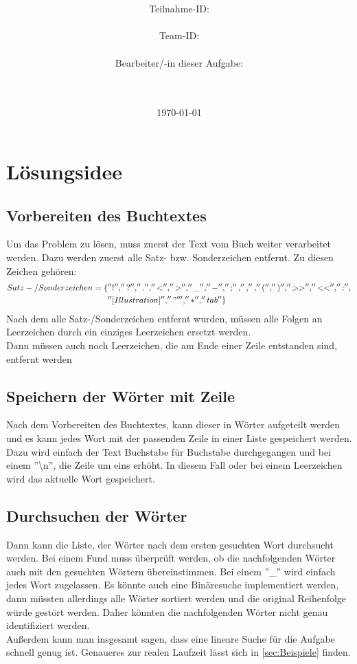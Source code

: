 \documentclass[a4paper,10pt,ngerman]{scrartcl}
\title{\textbf{\Huge\Aufgabe}}
\author{\LARGE Teilnahme-ID: \LARGE \TeilnahmeId \\\\
      \LARGE Team-ID: \LARGE \TeamId \\\\
	    \LARGE Bearbeiter/-in dieser Aufgabe: \\ 
	    \LARGE \Name\\\\}
\date{\LARGE\today}
\begin{document}
  \maketitle
  \tableofcontents
  \vspace{4cm}
  \section{Lösungsidee\label{sec:Loesungsidee}}
    \subsection{Vorbereiten des Buchtextes\label{sec:Loesungsidee:Vorbereiten}}
      Um das Problem zu lösen, muss zuerst der Text vom Buch weiter verarbeitet werden. Dazu werden zuerst alle Satz- bzw. Sonderzeichen entfernt. Zu diesen Zeichen gehören:\\
      \begin{equation}
        \begin{split}
          Satz-/Sonderzeichen = \{&''!'', ''?'', ''.'', ''<'', ''>'', ''\_'', ''-'', '';'', '','', ''('', '')'', ''>>'', ''<<'', '':'', \\
          & ''[Illustration]'', ''"''', ''*'', ''tab''\}
        \end{split}
      \end{equation}
      Nach dem alle Satz-/Sonderzeichen entfernt wurden, müssen alle Folgen an Leerzeichen durch ein einziges Leerzeichen ersetzt werden.\\
      Dann müssen auch noch Leerzeichen, die am Ende einer Zeile entstanden sind, entfernt werden
    \subsection{Speichern der Wörter mit Zeile}
      Nach dem Vorbereiten des Buchtextes, kann dieser in Wörter aufgeteilt werden und es kann jedes Wort mit der passenden Zeile in einer Liste gespeichert werden. Dazu wird einfach der Text Buchstabe für Buchstabe durchgegangen und bei einem ''\textbackslash n'', die Zeile um eins erhöht. In diesem Fall oder bei einem Leerzeichen wird das aktuelle Wort gespeichert.
    \subsection{Durchsuchen der Wörter}
      Dann kann die Liste, der Wörter nach dem ersten gesuchten Wort durchsucht werden. Bei einem Fund muss überprüft werden, ob die nachfolgenden Wörter auch mit den gesuchten Wörtern übereinstimmen. Bei einem ''\_'' wird einfach jedes Wort zugelassen. Es könnte auch eine Binäresuche implementiert werden, dann müssten allerdings alle Wörter sortiert werden und die original Reihenfolge würde gestört werden. Daher könnten die nachfolgenden Wörter nicht genau identifiziert werden.\\
      Außerdem kann man insgesamt sagen, dass eine lineare Suche für die Aufgabe schnell genug ist. Genaueres zur realen Laufzeit lässt sich in \cref{sec:Beispiele} finden.
\end{document}
